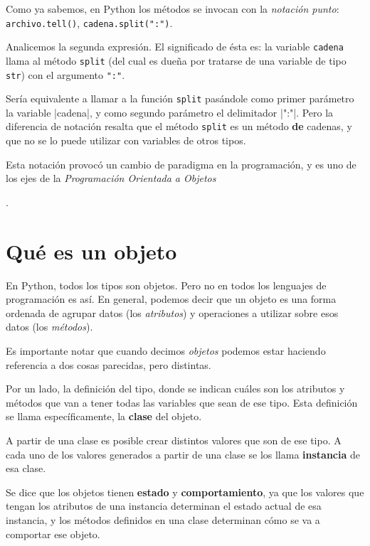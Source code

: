 \begin{observacion}
Como ya sabemos, en Python los métodos se invocan con la {\it notación punto}:
\lstinline+archivo.tell()+, \lstinline+cadena.split(":")+.

Analicemos la segunda expresión.  El significado de ésta es: la variable
\lstinline!cadena! llama al método \lstinline+split+ (del cual es dueña
por tratarse de una variable de tipo \lstinline!str!) con el argumento
\lstinline+":"+.

Sería equivalente a llamar a la función \lstinline!split! pasándole como
primer parámetro la variable |cadena|, y como segundo parámetro el delimitador
|":"|.
Pero la diferencia de notación resalta que el método \lstinline!split! es
un método {\bf de} cadenas, y que no se lo puede utilizar con variables de
otros tipos.

Esta notación provocó un cambio de paradigma en la programación, y es uno de
los ejes de la {\it Programación Orientada a Objetos}
\end{observacion}.

\section{Qué es un objeto}

En Python, todos los tipos son objetos.  Pero no en todos los lenguajes de
programación es así.  En general, podemos decir que un objeto es una forma
ordenada de agrupar datos (los {\it atributos}) y operaciones a utilizar
sobre esos datos (los {\it métodos}).

Es importante notar que cuando decimos {\it objetos} podemos estar haciendo
referencia a dos cosas parecidas, pero distintas.

Por un lado, la definición del tipo, donde se indican cuáles son los
atributos y métodos que van a tener todas las variables que sean de ese
tipo.  Esta definición se llama específicamente, la {\bf clase} del objeto.

A partir de una clase es posible crear distintos valores que son de ese
tipo. A cada uno de los valores generados a partir de una clase se los llama
{\bf instancia} de esa clase.

\begin{observacion}
Se dice que los objetos tienen {\bf estado} y {\bf comportamiento}, ya que
los valores que tengan los atributos de una instancia determinan el estado
actual de esa instancia, y los métodos definidos en una clase determinan
cómo se va a comportar ese objeto.
\end{observacion}

